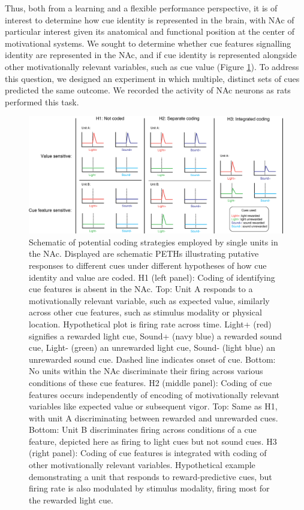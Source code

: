 \documentclass[11pt]{article}
\begin{document}
Thus, both from a learning and a flexible performance perspective, it is of interest to determine how cue identity is represented in the brain, with NAc of particular interest given its anatomical and functional position at the center of motivational systems. We sought to determine whether cue features signalling identity are represented in the NAc, and if cue identity is represented alongside other motivationally relevant variables, such as cue value (Figure \ref{fig:schematic}). To address this question, we designed an experiment in which multiple, distinct sets of cues predicted the same outcome. We recorded the activity of NAc neurons as rats performed this task. 

\begin{figure}[h]
\centering
\includegraphics[width=\textwidth]{Fig 1 - Schematic neural.png}
\caption{Schematic of potential coding strategies employed by single units in the NAc. Displayed are schematic PETHs illustrating putative responses to different cues under different hypotheses of how cue identity and value are coded. H1 (left panel): Coding of identifying cue features is absent in the NAc. Top: Unit A responds to a motivationally relevant variable, such as expected value, similarly across other cue features, such as stimulus modality or physical location. Hypothetical plot is firing rate across time. Light+ (red) signifies a rewarded light cue, Sound+ (navy blue) a rewarded sound cue, Light- (green) an unrewarded light cue, Sound- (light blue) an unrewarded sound cue. Dashed line indicates onset of cue. Bottom: No units within the NAc discriminate their firing across various conditions of these cue features. H2 (middle panel): Coding of cue features occurs independently of encoding of motivationally relevant variables like expected value or subsequent vigor. Top: Same as H1, with unit A discriminating between rewarded and unrewarded cues. Bottom: Unit B discriminates firing across conditions of a cue feature, depicted here as firing to light cues but not sound cues. H3 (right panel): Coding of cue features is integrated with coding of other motivationally relevant variables. Hypothetical example demonstrating a unit that responds to reward-predictive cues, but firing rate is also modulated by stimulus modality, firing most for the rewarded light cue.}
\label{fig:schematic}
\end{figure}
\end{document}
